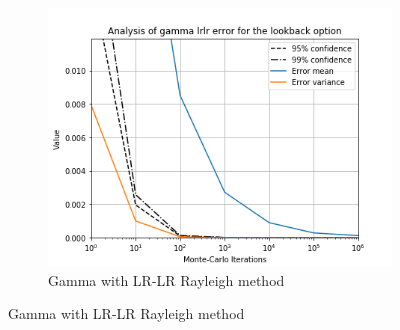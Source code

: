 \documentclass[11pt,a4paper,fleqn]{article}
\begin{document}
\begin{figure}[h!]
\begin{subfigure}[b]{0.3\textwidth}
          \includegraphics[width=\textwidth]{graphs/lookbackgammalrlr.png}
          \caption{Gamma with LR-LR Rayleigh method}
      \end{subfigure}


\end{figure}
\end{document}
